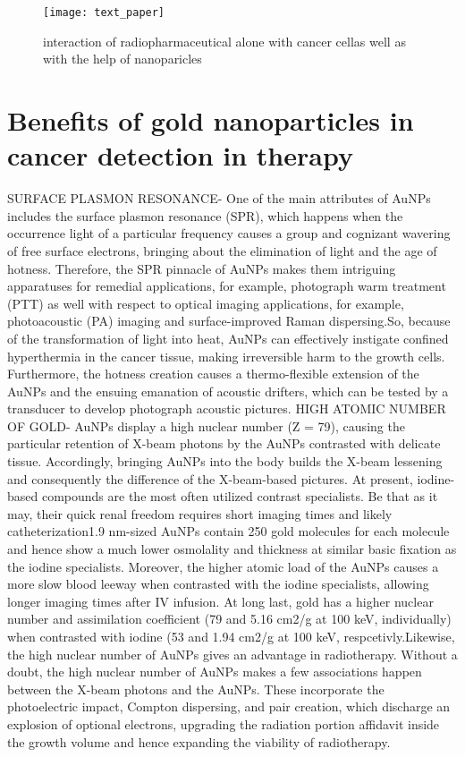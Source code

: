 \documentclass{article}
\begin{document}
\begin{figure}
\begin{center}
\texttt{[image: text\_paper]}
\end{center}
\caption{interaction of radiopharmaceutical alone with cancer cellas well as with the help of nanoparicles}
\end{figure}

\section*{Benefits of gold nanoparticles in cancer detection in therapy}
SURFACE PLASMON RESONANCE- One of the main attributes of AuNPs includes the surface plasmon resonance (SPR), which happens when the occurrence light of a particular frequency causes a group and cognizant wavering of free surface electrons, bringing about the elimination of light and the age of hotness. Therefore, the SPR pinnacle of AuNPs makes them intriguing apparatuses for remedial applications, for example, photograph warm treatment (PTT) as well with respect to optical imaging applications, for example, photoacoustic (PA) imaging and surface-improved Raman dispersing.So, because of the transformation of light into heat, AuNPs can effectively instigate confined hyperthermia in the cancer tissue, making irreversible harm to the growth cells. Furthermore, the hotness creation causes a thermo-flexible extension of the AuNPs and the ensuing emanation of acoustic drifters, which can be tested by a transducer to develop photograph acoustic pictures.
\newline
\newline
HIGH ATOMIC NUMBER OF GOLD-  AuNPs display a high nuclear number (Z = 79), causing the particular retention of X-beam photons by the AuNPs contrasted with delicate tissue. Accordingly, bringing AuNPs into the body builds the X-beam lessening and consequently the difference of the X-beam-based pictures. At present, iodine-based compounds are the most often utilized contrast specialists. Be that as it may, their quick renal freedom requires short imaging times and likely catheterization1.9 nm-sized AuNPs contain 250 gold molecules for each molecule and hence show a much lower osmolality and thickness at similar basic fixation as the iodine specialists. Moreover, the higher atomic load of the AuNPs causes a more slow blood leeway when contrasted with the iodine specialists, allowing longer imaging times after IV infusion. At long last, gold has a higher nuclear number and assimilation coefficient (79 and 5.16 cm2/g at 100 keV, individually) when contrasted with iodine (53 and 1.94 cm2/g at 100 keV, respcetivly.Likewise, the high nuclear number of AuNPs gives an advantage in radiotherapy. Without a doubt, the high nuclear number of AuNPs makes a few associations happen between the X-beam photons and the AuNPs. These incorporate the photoelectric impact, Compton dispersing, and pair creation, which discharge an explosion of optional electrons, upgrading the radiation portion affidavit inside the growth volume and hence expanding the viability of radiotherapy.
\end{document}
